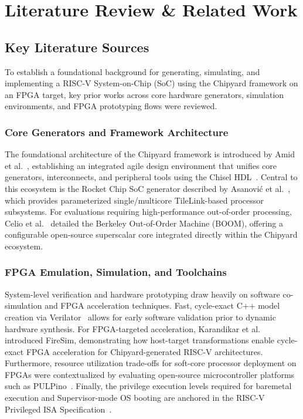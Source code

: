 \documentclass[12pt,a4paper]{article}
\begin{document}
\section{Literature Review \& Related Work}

\subsection{Key Literature Sources}
To establish a foundational background for generating, simulating, and implementing a RISC-V System-on-Chip (SoC) using the Chipyard framework on an FPGA target, key prior works across core hardware generators, simulation environments, and FPGA prototyping flows were reviewed.

\subsubsection{Core Generators and Framework Architecture}
The foundational architecture of the Chipyard framework is introduced by Amid et al.~\cite{amid2020chipyard}, establishing an integrated agile design environment that unifies core generators, interconnects, and peripheral tools using the Chisel HDL~\cite{bachrach2012chisel}. Central to this ecosystem is the Rocket Chip SoC generator described by Asanovi\'{c} et al.~\cite{asanovic2016rocket}, which provides parameterized single/multicore TileLink-based processor subsystems. For evaluations requiring high-performance out-of-order processing, Celio et al.~\cite{celio2015boom} detailed the Berkeley Out-of-Order Machine (BOOM), offering a configurable open-source superscalar core integrated directly within the Chipyard ecosystem.

\subsubsection{FPGA Emulation, Simulation, and Toolchains}
System-level verification and hardware prototyping draw heavily on software co-simulation and FPGA acceleration techniques. Fast, cycle-exact C++ model creation via Verilator~\cite{snyder2004verilator} allows for early software validation prior to dynamic hardware synthesis. For FPGA-targeted acceleration, Karandikar et al.~\cite{karandikar2018firesim} introduced FireSim, demonstrating how host-target transformations enable cycle-exact FPGA acceleration for Chipyard-generated RISC-V architectures. Furthermore, resource utilization trade-offs for soft-core processor deployment on FPGAs were contextualized by evaluating open-source microcontroller platforms such as PULPino~\cite{traber2016pulpino}. Finally, the privilege execution levels required for baremetal execution and Supervisor-mode OS booting are anchored in the RISC-V Privileged ISA Specification~\cite{waterman2019riscv}.
\end{document}
